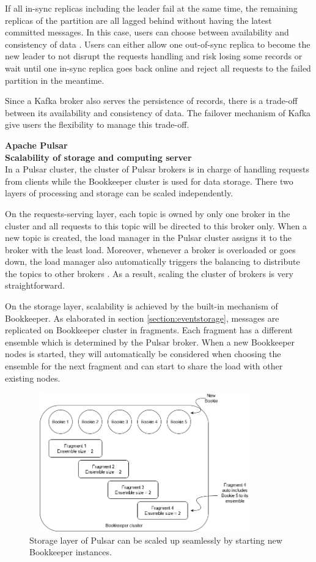 If all in-sync replicas including the leader fail at the same time, the remaining replicas of the partition are all lagged behind without having the latest committed messages. In this case, users can choose between availability and consistency of data \cite{kafkaleader}. Users can either allow one out-of-sync replica to become the new leader to not disrupt the requests handling and risk losing some records or wait until one in-sync replica goes back online and reject all requests to the failed partition in the meantime. 

Since a Kafka broker also serves the persistence of records, there is a trade-off between its availability and consistency of data. The failover mechanism of Kafka give users the flexibility to manage this trade-off.

\large \textbf{Apache Pulsar}\\
\normalsize
\textbf{Scalability of storage and computing server}\\
In a Pulsar cluster, the cluster of Pulsar brokers is in charge of handling requests from clients while the Bookkeeper cluster is used for data storage. There two layers of processing and storage can be scaled independently.

On the requests-serving layer, each topic is owned by only one broker in the cluster and all requests to this topic will be directed to this broker only. When a new topic is created, the load manager in the Pulsar cluster assigns it to the broker with the least load. Moreover, whenever a broker is overloaded or goes down, the load manager also automatically triggers the balancing to distribute the topics to other brokers \cite{pulsarloadbalance}. As a result, scaling the cluster of brokers is very straightforward. 

On the storage layer, scalability is achieved by the built-in mechanism of Bookkeeper. As elaborated in section \ref{section:eventstorage}, messages are replicated on Bookkeeper cluster in fragments. Each fragment has a different ensemble which is determined by the Pulsar broker. When a new Bookkeeper nodes is started, they will automatically be considered when choosing the ensemble for the next fragment and can start to share the load with other existing nodes. 
\begin{figure}[h]
	\centering
	\includegraphics[width=10cm,height=6cm]{images/scalability-pulsar.png}
	\caption{Storage layer of Pulsar can be scaled up seamlessly by starting new Bookkeeper instances.}
	\label{fig:scalabilitypulsar}
\end{figure}

